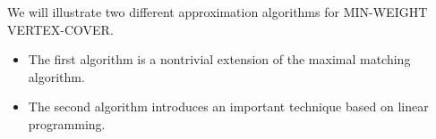We will illustrate two different approximation algorithms for MIN-WEIGHT VERTEX-COVER.
\begin{itemize}
\item The first algorithm is a nontrivial extension of the maximal matching algorithm.
\item The second algorithm introduces an important technique based on linear programming.
\end{itemize}
